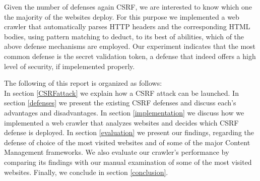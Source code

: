 Given the number of defenses again CSRF, we are interested to know which one the majority of the websites 
deploy.  For this purpose we implemented a web crawler that automatically parses HTTP headers and the 
corresponding HTML bodies, using pattern matching to deduct, to its best of abilities, which of the above
defense mechanisms are employed. Our experiment indicates that the most common defense is the secret 
validation token, a defense that indeed offers a high level of security, if impelemented properly.

The following of this report is organized as follows: \\
	In section \ref{CSRFattack} we explain how a CSRF attack can be launched.  In section \ref{defenses} we 
	present the existing CSRF defenses and discuss each's advantages and disadvantages.  In section \ref{implementation}
	we discuss how we implemented a web crawler that analyzes websites and decides which CSRF defense is deployed.  In
	section \ref{evaluation} we present our findings, regarding the defense of choice of the most visited websites 
	and of some of the major Content Management frameworks.  We also evaluate our crawler's performance by comparing
	its findings with our manual examination of some of the most visited websites.  Finally, we conclude in section 
	\ref{conclusion}.
